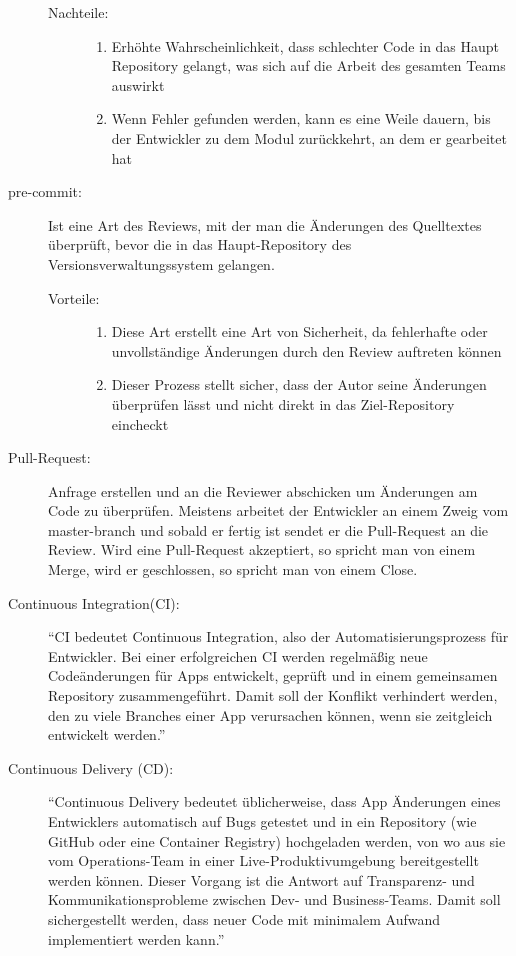 \begin{description}
\begin{description}
			\item[Nachteile:] \hfill
			\begin{enumerate}
				\item Erhöhte Wahrscheinlichkeit, dass schlechter Code in das Haupt Repository gelangt, was sich auf die Arbeit des gesamten Teams auswirkt
				\item Wenn Fehler gefunden werden, kann es eine Weile dauern, bis der Entwickler zu dem Modul zurückkehrt, an dem er gearbeitet hat
			\end{enumerate}
		\end{description}
		
		
	\item [pre-commit:]
		Ist eine Art des Reviews, mit der man die Änderungen des Quelltextes überprüft, bevor die in das Haupt-Repository des Versionsverwaltungssystem gelangen.
		\begin{description}
			\item [Vorteile:] \hfill
			\begin{enumerate}
				\item Diese Art erstellt eine Art von Sicherheit, da fehlerhafte oder unvollständige Änderungen durch den Review auftreten können
				\item Dieser Prozess stellt sicher, dass der Autor seine Änderungen überprüfen lässt und nicht direkt in das Ziel-Repository eincheckt
			\end{enumerate}
		\end{description}
		
	\item [Pull-Request:]
		Anfrage erstellen und an die Reviewer abschicken um Änderungen am Code zu überprüfen. Meistens arbeitet der Entwickler an einem Zweig vom master-branch und sobald er fertig ist 			sendet er die Pull-Request an die Review. Wird eine Pull-Request akzeptiert, so spricht man von einem Merge, wird er geschlossen, so spricht man von einem Close.
	
	\item [Continuous Integration(CI):]
		"`CI bedeutet Continuous Integration, also der Automatisierungsprozess für Entwickler. Bei einer erfolgreichen CI werden regelmäßig neue Codeänderungen für Apps entwickelt, 				geprüft und in einem gemeinsamen Repository zusammengeführt. Damit soll der Konflikt verhindert werden, den zu viele Branches einer App verursachen können, wenn sie zeitgleich 			entwickelt werden."' \cite{RedHat}
			
	\item [Continuous Delivery (CD):]
		"`Continuous Delivery bedeutet üblicherweise, dass App Änderungen eines Entwicklers automatisch auf Bugs getestet und in ein Repository (wie GitHub oder eine Container 					Registry) hochgeladen werden, von wo aus sie vom Operations-Team in einer Live-Produktivumgebung bereitgestellt werden können. Dieser Vorgang ist die Antwort auf Transparenz- 				und Kommunikationsprobleme zwischen Dev- und Business-Teams. Damit soll sichergestellt werden, dass neuer Code mit minimalem Aufwand implementiert werden kann."' \cite{RedHat}
		

\end{description}

